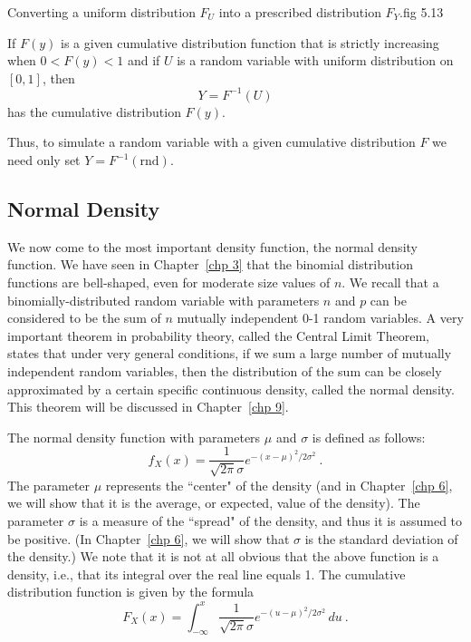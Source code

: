 {Converting a uniform distribution $F_{U}$ into a prescribed distribution $F_{Y}$.}{fig
5.13}%

\begin{corollary}\label{cor 5.2}  If $F(y)$ is a given cumulative distribution function that is
strictly increasing when $0 < F(y) < 1$ and if $U$ is a random variable with uniform
distribution on
$[0,1]$, then
$$ 
Y = F^{-1}(U)
$$ 
has the cumulative distribution $F(y)$.
\end{corollary}

Thus, to simulate a random variable with a given cumulative distribution $F$ we need only set $Y =
F^{-1}(\mbox{rnd})$.

\subsection*{Normal Density} 
We now come to the most important density function, the normal density function. 
We have seen in Chapter~\ref{chp 3} that the binomial distribution
functions are bell-shaped, even for moderate size values of $n$.  We recall that a
binomially-distributed random variable with parameters $n$ and $p$ can be considered
to be the sum of $n$ mutually independent 0-1 random variables.  A very important
theorem in probability theory, called the Central Limit Theorem, states that under
very general conditions, if we sum a large number of mutually independent random
variables, then the distribution of the sum can be closely approximated by a certain
specific continuous density, called the normal density.  This theorem will be
discussed in Chapter~\ref{chp 9}.  
\par
The normal density function with parameters $\mu$ and $\sigma$ is defined as follows:
$$
f_X(x) = \frac 1{\sqrt{2\pi}\sigma} e^{-(x - \mu)^2/2\sigma^2}\ .
$$
The parameter $\mu$ represents the ``center" of the density (and in Chapter~\ref{chp
6}, we will show that it is the average, or expected, value of the density).  The
parameter $\sigma$ is a measure of the ``spread" of the density, and thus it is
assumed to be positive.  (In Chapter~\ref{chp 6}, we will show that $\sigma$ is the
standard deviation of the density.)  We note that it is not at all obvious that the
above function is a density, i.e., that its integral over the real line equals 1.
The cumulative distribution function is given by the formula
$$ F_X(x) = \int_{-\infty}^x \frac 1{\sqrt{2\pi}\sigma} e^{-(u -
\mu)^2/2\sigma^2}\,du\ .
$$

